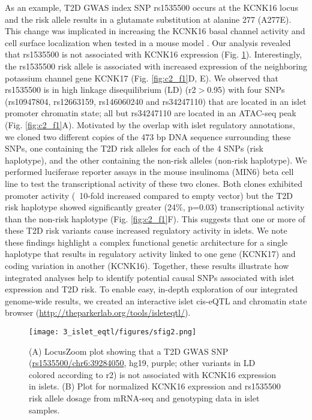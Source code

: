 As an example, T2D GWAS index SNP rs1535500 occurs at the KCNK16 locus and the risk allele results in a glutamate substitution at alanine 277 (A277E). This change was implicated in increasing the KCNK16 basal channel activity and cell surface localization when tested in a mouse model \cite{vierraTypeDiabetesAssociated2015}. Our analysis revealed that rs1535500 is not associated with KCNK16 expression (Fig. \ref{fig:c2_sf2}). Interestingly, the rs1535500 risk allele is associated with increased expression of the neighboring potassium channel gene KCNK17 (Fig. \ref{fig:c2_f1}D, E).  We observed that rs1535500 is in high linkage disequilibrium (LD) (r2$>$0.95) with four SNPs (rs10947804, rs12663159, rs146060240 and rs34247110) that are located in an islet promoter chromatin state; all but rs34247110 are located in an ATAC-seq peak (Fig. \ref{fig:c2_f1}A).  Motivated by the overlap with islet regulatory annotations, we cloned two different copies of the 473 bp DNA sequence surrounding these SNPs, one containing the T2D risk alleles for each of the 4 SNPs (risk haplotype), and the other containing the non-risk alleles (non-risk haplotype). We performed luciferase reporter assays in the mouse insulinoma (MIN6) beta cell line to test the transcriptional activity of these two clones. Both clones exhibited promoter activity (~10-fold increased compared to empty vector) but the T2D risk haplotype showed significantly greater (24\%, p=0.03) transcriptional activity than the non-risk haplotype (Fig. \ref{fig:c2_f1}F). This suggests that one or more of these T2D risk variants cause increased regulatory activity in islets. We note these findings highlight a complex functional genetic architecture for a single haplotype that results in regulatory activity linked to one gene (KCNK17) and coding variation in another (KCNK16). Together, these results illustrate how integrated analyses help to identify potential causal SNPs associated with islet expression and T2D risk. To enable easy, in-depth exploration of our integrated genome-wide results, we created an interactive islet cis-eQTL and chromatin state browser (\url{http://theparkerlab.org/tools/isleteqtl/}).

\begin{figure}
    \centering
    \texttt{[image: 3\_islet\_eqtl/figures/sfig2.png]}
    \caption[The \textit{KCNK16} genomic locus]{(A) LocusZoom plot showing that a T2D GWAS SNP (\url{rs1535500/chr6:39284050}, hg19, purple; other variants in LD colored according to r2) is not associated with KCNK16 expression in islets. (B) Plot for normalized KCNK16 expression and rs1535500 risk allele dosage from mRNA-seq and genotyping data in islet samples.}
    \label{fig:c2_sf2}
\end{figure}

